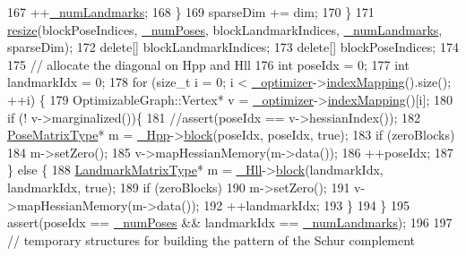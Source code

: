 \begin{DoxyCode}
167       ++\hyperlink{classg2o_1_1BlockSolver_ab98231b7ca8e6d7f138c33d26c6f4326}{\_numLandmarks};
168     \}
169     sparseDim += dim;
170   \}
171   \hyperlink{classg2o_1_1BlockSolver_a0075af2df18364cf99fd80f813b8ce4b}{resize}(blockPoseIndices, \hyperlink{classg2o_1_1BlockSolver_a709259fc290d746f4174d25410b7458a}{\_numPoses}, blockLandmarkIndices, 
      \hyperlink{classg2o_1_1BlockSolver_ab98231b7ca8e6d7f138c33d26c6f4326}{\_numLandmarks}, sparseDim);
172   \textcolor{keyword}{delete}[] blockLandmarkIndices;
173   \textcolor{keyword}{delete}[] blockPoseIndices;
174 
175   \textcolor{comment}{// allocate the diagonal on Hpp and Hll}
176   \textcolor{keywordtype}{int} poseIdx = 0;
177   \textcolor{keywordtype}{int} landmarkIdx = 0;
178   \textcolor{keywordflow}{for} (\textcolor{keywordtype}{size\_t} i = 0; i < \hyperlink{classg2o_1_1Solver_aff3275985d996329df15070348c21292}{\_optimizer}->\hyperlink{classg2o_1_1SparseOptimizer_a5e98a5f879f04c013b20f9c39a9057da}{indexMapping}().size(); ++i) \{
179     OptimizableGraph::Vertex* v = \hyperlink{classg2o_1_1Solver_aff3275985d996329df15070348c21292}{\_optimizer}->\hyperlink{classg2o_1_1SparseOptimizer_a5e98a5f879f04c013b20f9c39a9057da}{indexMapping}()[i];
180     \textcolor{keywordflow}{if} (! v->marginalized())\{
181       \textcolor{comment}{//assert(poseIdx == v->hessianIndex());}
182       \hyperlink{classg2o_1_1BlockSolver_a8c7c43d361bd31e3e0353889ba703bc0}{PoseMatrixType}* m = \hyperlink{classg2o_1_1BlockSolver_ac222d4342825ed8632a87b4f5be94618}{\_Hpp}->\hyperlink{classg2o_1_1SparseBlockMatrix_aaca7b38d2e9a18eebf9e6f5957af0cf7}{block}(poseIdx, poseIdx, \textcolor{keyword}{true});
183       \textcolor{keywordflow}{if} (zeroBlocks)
184         m->setZero();
185       v->mapHessianMemory(m->data());
186       ++poseIdx;
187     \} \textcolor{keywordflow}{else} \{
188       \hyperlink{classg2o_1_1BlockSolver_afd898a666343291129d37a979e23ded6}{LandmarkMatrixType}* m = \hyperlink{classg2o_1_1BlockSolver_a88d4c24df24a8fb72be1a4e4cff03d71}{\_Hll}->\hyperlink{classg2o_1_1SparseBlockMatrix_aaca7b38d2e9a18eebf9e6f5957af0cf7}{block}(landmarkIdx, landmarkIdx, \textcolor{keyword}{true});
189       \textcolor{keywordflow}{if} (zeroBlocks)
190         m->setZero();
191       v->mapHessianMemory(m->data());
192       ++landmarkIdx;
193     \}
194   \}
195   assert(poseIdx == \hyperlink{classg2o_1_1BlockSolver_a709259fc290d746f4174d25410b7458a}{\_numPoses} && landmarkIdx == \hyperlink{classg2o_1_1BlockSolver_ab98231b7ca8e6d7f138c33d26c6f4326}{\_numLandmarks});
196 
197   \textcolor{comment}{// temporary structures for building the pattern of the Schur complement}

\end{DoxyCode}
